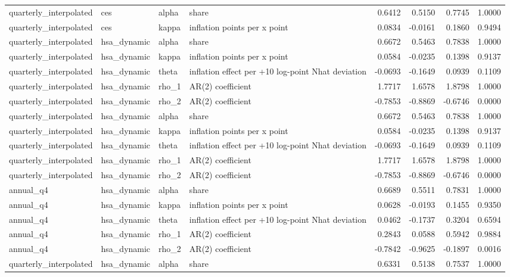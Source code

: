 \begin{tabular}{llllrrrr}
quarterly\_interpolated & ces & alpha & share & 0.6412 & 0.5150 & 0.7745 & 1.0000 \\
quarterly\_interpolated & ces & kappa & inflation points per x point & 0.0834 & -0.0161 & 0.1860 & 0.9494 \\
quarterly\_interpolated & hsa\_dynamic & alpha & share & 0.6672 & 0.5463 & 0.7838 & 1.0000 \\
quarterly\_interpolated & hsa\_dynamic & kappa & inflation points per x point & 0.0584 & -0.0235 & 0.1398 & 0.9137 \\
quarterly\_interpolated & hsa\_dynamic & theta & inflation effect per +10 log-point Nhat deviation & -0.0693 & -0.1649 & 0.0939 & 0.1109 \\
quarterly\_interpolated & hsa\_dynamic & rho\_1 & AR(2) coefficient & 1.7717 & 1.6578 & 1.8798 & 1.0000 \\
quarterly\_interpolated & hsa\_dynamic & rho\_2 & AR(2) coefficient & -0.7853 & -0.8869 & -0.6746 & 0.0000 \\
quarterly\_interpolated & hsa\_dynamic & alpha & share & 0.6672 & 0.5463 & 0.7838 & 1.0000 \\
quarterly\_interpolated & hsa\_dynamic & kappa & inflation points per x point & 0.0584 & -0.0235 & 0.1398 & 0.9137 \\
quarterly\_interpolated & hsa\_dynamic & theta & inflation effect per +10 log-point Nhat deviation & -0.0693 & -0.1649 & 0.0939 & 0.1109 \\
quarterly\_interpolated & hsa\_dynamic & rho\_1 & AR(2) coefficient & 1.7717 & 1.6578 & 1.8798 & 1.0000 \\
quarterly\_interpolated & hsa\_dynamic & rho\_2 & AR(2) coefficient & -0.7853 & -0.8869 & -0.6746 & 0.0000 \\
annual\_q4 & hsa\_dynamic & alpha & share & 0.6689 & 0.5511 & 0.7831 & 1.0000 \\
annual\_q4 & hsa\_dynamic & kappa & inflation points per x point & 0.0628 & -0.0193 & 0.1455 & 0.9350 \\
annual\_q4 & hsa\_dynamic & theta & inflation effect per +10 log-point Nhat deviation & 0.0462 & -0.1737 & 0.3204 & 0.6594 \\
annual\_q4 & hsa\_dynamic & rho\_1 & AR(2) coefficient & 0.2843 & 0.0588 & 0.5942 & 0.9884 \\
annual\_q4 & hsa\_dynamic & rho\_2 & AR(2) coefficient & -0.7842 & -0.9625 & -0.1897 & 0.0016 \\
quarterly\_interpolated & hsa\_dynamic & alpha & share & 0.6331 & 0.5138 & 0.7537 & 1.0000 \\

\end{tabular}
